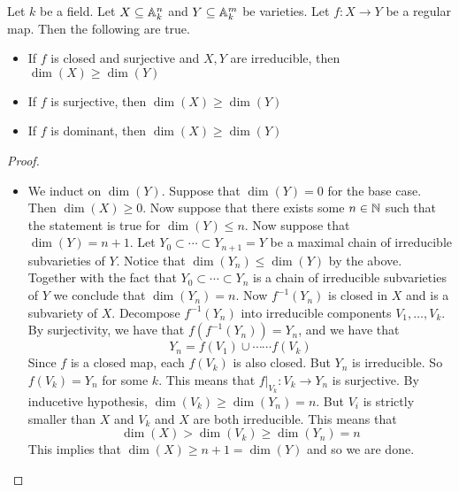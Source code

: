 \documentclass[a4paper]{article}
\begin{document}
\begin{prp}{}{} Let $k$ be a field. Let $X\subseteq\mathbb{A}_k^n$ and $Y\subseteq\mathbb{A}_k^m$ be varieties. Let $f:X\to Y$ be a regular map. Then the following are true. 
\begin{itemize}
\item If $f$ is closed and surjective and $X,Y$ are irreducible, then $\dim(X)\geq\dim(Y)$
\item If $f$ is surjective, then $\dim(X)\geq\dim(Y)$
\item If $f$ is dominant, then $\dim(X)\geq\dim(Y)$
\end{itemize} \tcbline
\begin{proof}~\\
\begin{itemize}
\item We induct on $\dim(Y)$. Suppose that $\dim(Y)=0$ for the base case. Then $\dim(X)\geq 0$. Now suppose that there exists some $n\in\mathbb{N}$ such that the statement is true for $\dim(Y)\leq n$. Now suppose that $\dim(Y)=n+1$. Let $Y_0\subset\cdots\subset Y_{n+1}=Y$ be a maximal chain of irreducible subvarieties of $Y$. Notice that $\dim(Y_n)\leq\dim(Y)$ by the above. Together with the fact that $Y_0\subset\cdots\subset Y_n$ is a chain of irreducible subvarieties of $Y$ we conclude that $\dim(Y_n)=n$. Now $f^{-1}(Y_n)$ is closed in $X$ and is a subvariety of $X$. Decompose $f^{-1}(Y_n)$ into irreducible components $V_1,\dots,V_k$. By surjectivity, we have that $f(f^{-1}(Y_n))=Y_n$, and we have that $$Y_n=f(V_1)\cup\cdots\cdots f(V_k)$$ Since $f$ is a closed map, each $f(V_k)$ is also closed. But $Y_n$ is irreducible. So $f(V_k)=Y_n$ for some $k$. This means that $f|_{V_k}:V_k\to Y_n$ is surjective. By inducetive hypothesis, $\dim(V_k)\geq\dim(Y_n)=n$. But $V_i$ is strictly smaller than $X$ and $V_k$ and $X$ are both irreducible. This means that $$\dim(X)>\dim(V_k)\geq\dim(Y_n)=n$$ This implies that $\dim(X)\geq n+1=\dim(Y)$ and so we are done. 
\end{itemize}
\end{proof}
\end{prp}
\end{document}
